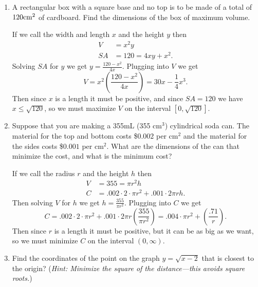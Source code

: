 \documentclass[11pt]{article}
\begin{document}
\drawtitle

\begin{enumerate}
\item A rectangular box with a square base and no top is to be made of
  a total of $120\rm{cm}^2$ of cardboard.  Find the dimensions of the
  box of maximum volume.

  \vfill
  {\color{blue}

    If we call the width and length $x$ and the height $y$ then
    \begin{align*}
      V &= x^2y\\
      SA &= 120 = 4xy + x^2.
    \end{align*}
    Solving $SA$ for $y$ we get $y=\frac{120-x^2}{4x}$.  Plugging into $V$
    we get
    \[
    V = x^2\left(\frac{120-x^2}{4x}\right) = 30x-\frac{1}{4}x^3.
    \]
    Then since $x$ is a length it must be positive, and since $SA=120$
    we have $x\leq \sqrt{120}$, so we must maximize $V$ on the
    interval $\left[0,\sqrt{120}\right]$.

  }
  \vfill

  \newpage
  
\item Suppose that you are making a 355mL (355 cm$^3$) cylindrical
  soda can.  The material for the top and bottom costs \$$0.002$ per
  cm$^2$ and the material for the sides costs \$$0.001$ per
  cm$^2$. What are the dimensions of the can that minimize the cost,
  and what is the minimum cost?

  \vfill
  {\color{blue}

    If we call the radius $r$ and the height $h$ then
    \begin{align*}
      V &= 355= \pi r^2 h\\
      C &= .002\cdot 2\cdot\pi r^2 + .001\cdot2\pi rh.
    \end{align*}
    Then solving $V$ for $h$ we get $h=\frac{355}{\pi r^2}$.  Plugging
    into $C$ we get
    \[
    C = .002\cdot 2\cdot\pi r^2 + .001\cdot2\pi r\left(\frac{355}{\pi
        r^2}\right) = .004\cdot\pi r^2 +
    \left(\frac{.71}{r}\right).
    \]
    Then since $r$ is a length it must be positive, but it can be as big as we want, so we must minimize $C$ on the
    interval $(0,\infty)$.

  }
  \vfill

  \newpage

\item Find the coordinates of the point on the graph $y=\sqrt{x-2}$
  that is closest to the origin? (\textit{Hint: Minimize the square of
    the distance---this avoids square roots.})


\end{enumerate}
\end{document}

